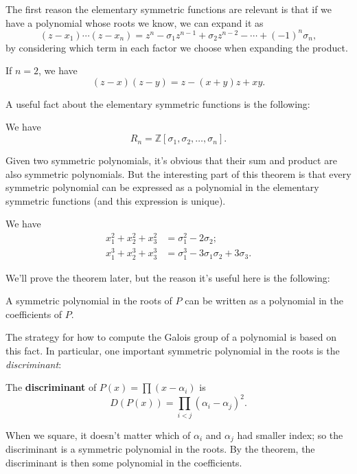 The first reason the elementary symmetric functions are relevant is that if we have a polynomial whose roots we know, we can expand it as \[(z - x_1)\cdots (z - x_n) = z^n - \sigma_1z^{n - 1} + \sigma_2z^{n - 2} - \cdots + (-1)^n\sigma_n,\] by considering which term in each factor we choose when expanding the product. 

\begin{example}
    If $n = 2$, we have \[(z - x)(z - y) = z - (x + y)z + xy.\] 
\end{example}

A useful fact about the elementary symmetric functions is the following:

\begin{theorem}
    We have \[R_n = \mathbb{Z}[\sigma_1, \sigma_2, \ldots, \sigma_n].\] 
\end{theorem}

Given two symmetric polynomials, it's obvious that their sum and product are also symmetric polynomials. But the interesting part of this theorem is that every symmetric polynomial can be expressed as a polynomial in the elementary symmetric functions (and this expression is unique). 

\begin{example}
    We have 
    \begin{align*}
        x_1^2 + x_2^2 + x_3^2 &= \sigma_1^2 - 2\sigma_2; \\
        x_1^3 + x_2^3 + x_3^3 &= \sigma_1^3 - 3\sigma_1\sigma_2 + 3\sigma_3.
    \end{align*}
\end{example}

We'll prove the theorem later, but the reason it's useful here is the following:

\begin{corollary}
    A symmetric polynomial in the roots of $P$ can be written as a polynomial in the coefficients of $P$. 
\end{corollary}

The strategy for how to compute the Galois group of a polynomial is based on this fact. In particular, one important symmetric polynomial in the roots is the \emph{discriminant}:

\begin{definition}
    The \textbf{discriminant} of $P(x) = \prod(x - \alpha_i)$ is \[D(P(x)) = \prod_{i < j} (\alpha_i - \alpha_j)^2.\] 
\end{definition}

When we square, it doesn't matter which of $\alpha_i$ and $\alpha_j$ had smaller index; so the discriminant is a symmetric polynomial in the roots. By the theorem, the discriminant is then some polynomial in the coefficients. 

